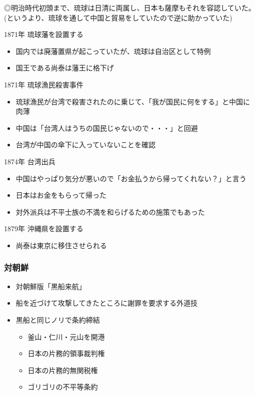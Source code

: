 \documentclass[12pt,fleqn]{ltjsarticle}
\begin{document}
◎明治時代初頭まで、琉球は日清に両属し、日本も薩摩もそれを容認していた。
(というより、琉球を通して中国と貿易をしていたので逆に助かっていた)

1871年 琉球藩を設置する
\begin{itemize}
\item 国内では廃藩置県が起こっていたが、琉球は自治区として特例
\item 国王である尚泰は藩王に格下げ
\end{itemize}
1871年 琉球漁民殺害事件
\begin{itemize}
\item 琉球漁民が台湾で殺害されたのに乗じて、「我が国民に何をする」と中国に肉薄
\item 中国は「台湾人はうちの国民じゃないので・・・」と回避
\item 台湾が中国の傘下に入っていないことを確認
\end{itemize}
1874年 台湾出兵
\begin{itemize}
\item 中国はやっぱり気分が悪いので「お金払うから帰ってくれない？」と言う
\item 日本はお金をもらって帰った
\item 対外派兵は不平士族の不満を和らげるための施策でもあった
\end{itemize}
1879年 沖縄県を設置する
\begin{itemize}
\item 尚泰は東京に移住させられる
\end{itemize}

\subsubsection{対朝鮮}
\begin{itemize}
\item 対朝鮮版「黒船来航」
\item 船を近づけて攻撃してきたところに謝罪を要求する外道技
\item 黒船と同じノリで条約締結

\begin{itemize}
\item 釜山・仁川・元山を開港
\item 日本の片務的領事裁判権
\item 日本の片務的無関税権
\item ゴリゴリの不平等条約
\end{itemize}
\end{itemize}
\end{document}
